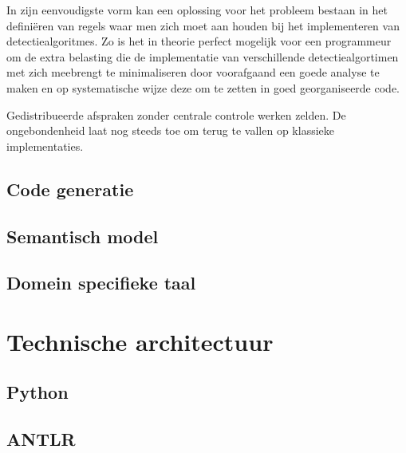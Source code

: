 In zijn eenvoudigste vorm kan een oplossing voor het probleem bestaan in het
defini\"eren van regels waar men zich moet aan houden bij het implementeren van
detectiealgoritmes. Zo is het in theorie perfect mogelijk voor een programmeur
om de extra belasting die de implementatie van verschillende detectiealgortimen
met zich meebrengt te minimaliseren door voorafgaand een goede analyse te maken
en op systematische wijze deze om te zetten in goed georganiseerde code.

Gedistribueerde afspraken zonder centrale controle werken zelden. De
ongebondenheid laat nog steeds toe om terug te vallen op klassieke
implementaties.

\subsection{Code generatie}

\TODO

\subsection{Semantisch model}

\TODO

\cite{fowler2010domain}

\subsection{Domein specifieke taal}



\section{Technische architectuur}
\label{section:techarch}

\TODO

\subsection{Python}

\TODO

\subsection{ANTLR}

\TODO

